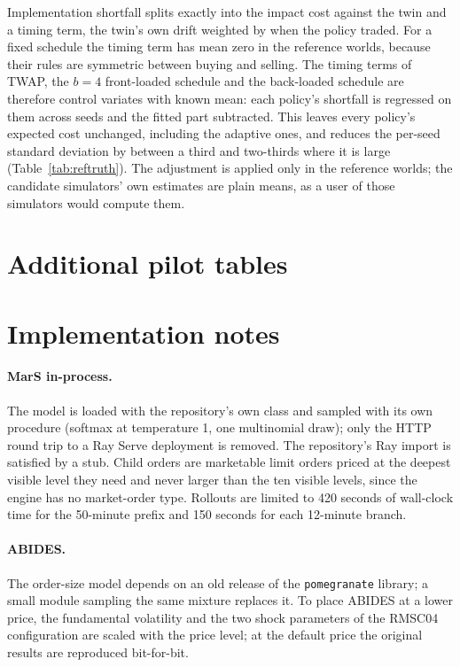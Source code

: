 Implementation shortfall splits exactly into the impact cost against the twin and a timing term, the twin's own drift weighted by when the policy traded. For a fixed schedule the timing term has mean zero in the reference worlds, because their rules are symmetric between buying and selling. The timing terms of TWAP, the $b=4$ front-loaded schedule and the back-loaded schedule are therefore control variates with known mean: each policy's shortfall is regressed on them across seeds and the fitted part subtracted. This leaves every policy's expected cost unchanged, including the adaptive ones, and reduces the per-seed standard deviation by between a third and two-thirds where it is large (Table~\ref{tab:reftruth}). The adjustment is applied only in the reference worlds; the candidate simulators' own estimates are plain means, as a user of those simulators would compute them.

\section{Additional pilot tables}
\label{app:pilot}




\section{Implementation notes}

\paragraph{MarS in-process.} The model is loaded with the repository's own class and sampled with its own procedure (softmax at temperature 1, one multinomial draw); only the HTTP round trip to a Ray Serve deployment is removed. The repository's Ray import is satisfied by a stub. Child orders are marketable limit orders priced at the deepest visible level they need and never larger than the ten visible levels, since the engine has no market-order type. Rollouts are limited to 420 seconds of wall-clock time for the 50-minute prefix and 150 seconds for each 12-minute branch.

\paragraph{ABIDES.} The order-size model depends on an old release of the \texttt{pomegranate} library; a small module sampling the same mixture replaces it. To place ABIDES at a lower price, the fundamental volatility and the two shock parameters of the RMSC04 configuration are scaled with the price level; at the default price the original results are reproduced bit-for-bit.


